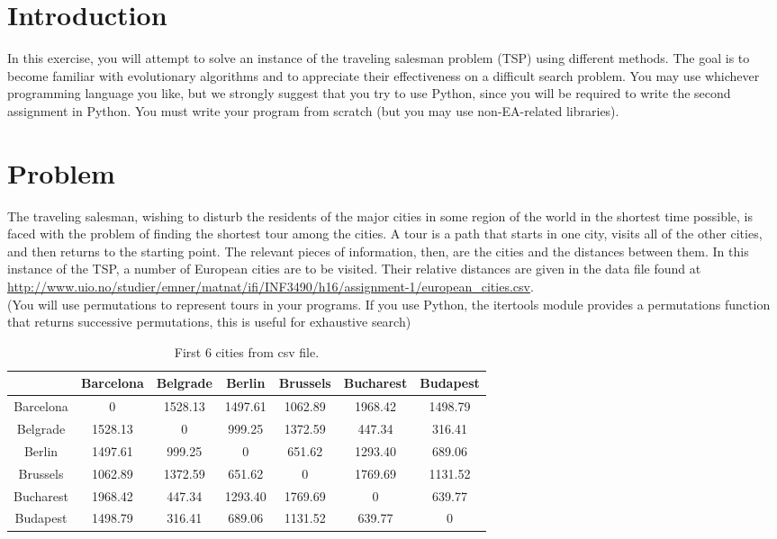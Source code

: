 \documentclass{article}           %
\begin{document}
\section*{Introduction}
In this exercise, you will attempt to solve an instance of the traveling
salesman problem (TSP) using different methods. The goal is to become familiar
with evolutionary algorithms and to appreciate their effectiveness on a
difficult search problem. You may use
whichever programming language you like, but we strongly suggest that you try
to use Python, since you will be required to write the second assignment in
Python. You must write your program from scratch (but you may use
non-EA-related libraries).

\section*{Problem}

The traveling salesman, wishing to disturb the residents of the major cities
in some region of the world in the shortest time possible, is faced with the
problem of finding the shortest tour among the cities. A tour is a path that
starts in one city, visits all of the other cities, and then returns to the
starting point. The relevant pieces of information, then, are the cities and
the distances between them. In this instance of the TSP, a number of European
cities are to be visited. Their relative distances are given in the data file
found at
\url{http://www.uio.no/studier/emner/matnat/ifi/INF3490/h16/assignment-1/european_cities.csv}.\\
(You will use permutations to represent tours in your programs. If you use
Python, the itertools module provides a permutations function that returns
successive permutations, this is useful for exhaustive search)

\begin{table}[]
\centering
  \begin{tabular}{|c|c|c|c|c|c|c|}
    \hline
              & Barcelona & Belgrade & Berlin  & Brussels & Bucharest & Budapest \\ \hline
    Barcelona & 0         & 1528.13  & 1497.61 & 1062.89  & 1968.42   & 1498.79  \\ \hline
    Belgrade  & 1528.13   & 0        & 999.25  & 1372.59  & 447.34    & 316.41   \\ \hline
    Berlin    & 1497.61   & 999.25   & 0       & 651.62   & 1293.40   & 689.06   \\ \hline
    Brussels  & 1062.89   & 1372.59  & 651.62  & 0        & 1769.69   & 1131.52  \\ \hline
    Bucharest & 1968.42   & 447.34   & 1293.40 & 1769.69  & 0         & 639.77   \\ \hline
    Budapest  & 1498.79   & 316.41   & 689.06  & 1131.52  & 639.77    & 0        \\ \hline
  \end{tabular}
  \caption{First 6 cities from csv file.}
  \label{tab:cities}
\end{table}
\end{document}
